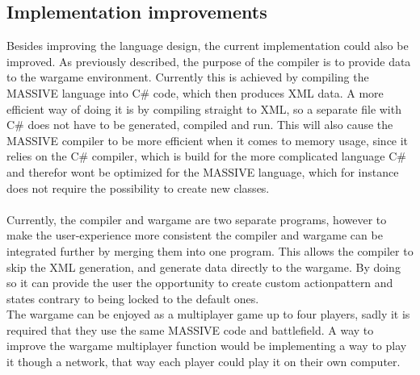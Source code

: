 \subsection{Implementation improvements}
Besides improving the language design, the current implementation could also be improved. As previously described, the purpose of the compiler is to provide data to the wargame environment.
Currently this is achieved by compiling the MASSIVE language into C\# code, which then produces XML data. 
A more efficient way of doing it is by compiling straight to XML, so a separate file with C\# does not have to be generated, compiled and run. 
This will also cause the MASSIVE compiler to be more efficient when it comes to memory usage, since it relies on the C\# compiler, which is build for the more complicated language C\# and therefor wont be optimized for the MASSIVE language, which for instance does not require the possibility to create new classes.\\
 \\
Currently, the compiler and wargame are two separate programs, however to make the user-experience more consistent the compiler and wargame can be integrated further by merging them into one program.
This allows the compiler to skip the XML generation, and generate data directly to the wargame. By doing so it can provide the user the opportunity to create custom actionpattern and states contrary to being locked to the default ones.\newline
 \\
The wargame can be enjoyed as a multiplayer game up to four players, sadly it is required that they use the same MASSIVE code and battlefield. A way to improve the wargame multiplayer function would be implementing a way to play it though a network, that way each player could play it on their own computer.

